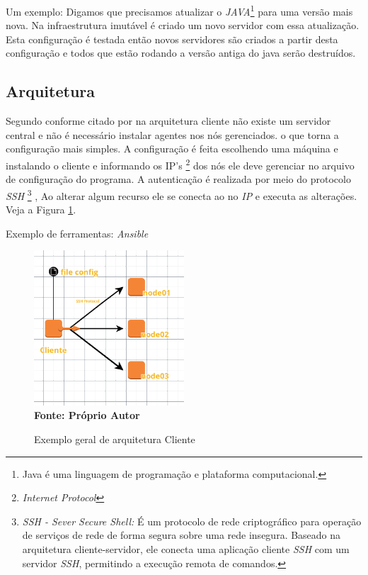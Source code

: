  Um exemplo: Digamos que precisamos atualizar o \textit{JAVA}\footnote{Java é uma linguagem de programação e plataforma computacional.} para uma versão mais nova. Na infraestrutura imutável é criado um novo servidor com essa atualização. Esta configuração é testada então novos servidores são criados a partir desta configuração e todos que estão rodando a versão antiga do java serão destruídos. 
 
\subsection{Arquitetura}

 \label{semagent}
Segundo  conforme citado por  na arquitetura cliente não existe um servidor central e não é necessário instalar agentes nos nós gerenciados. 
o que torna a configuração mais simples. A configuração é feita escolhendo uma máquina e instalando o cliente e informando os IP's \footnote{\textit{Internet Protocol}} dos nós ele deve gerenciar no arquivo de configuração do programa. A autenticação é realizada por meio do protocolo \textit{SSH} \footnote{\textit{SSH - Sever Secure Shell:}  É um protocolo de rede criptográfico para operação de serviços de rede de forma segura sobre uma rede insegura. Baseado na arquitetura cliente-servidor, ele conecta uma aplicação cliente \textit{SSH} com um servidor \textit{SSH}, permitindo a execução remota de comandos.} , Ao alterar algum recurso ele se conecta ao no \textit{IP} e executa as alterações. Veja a Figura \ref{fig:figura3}. 

Exemplo de ferramentas: \textit{Ansible}

\begin{figure}[ht]
	\centering	
	\caption[\hspace{0.1cm}Exemplo arquitetura Cliente]{Exemplo geral de arquitetura Cliente}
	\vspace{-0.4cm}
	\includegraphics[width=0.5\textwidth]{figuras/cliente.png}
	 \vspace{-0.2cm}
	\\\textbf{\footnotesize Fonte: Próprio Autor}
	\label{fig:figura3}
\end{figure}
\vspace{-0.5cm}


